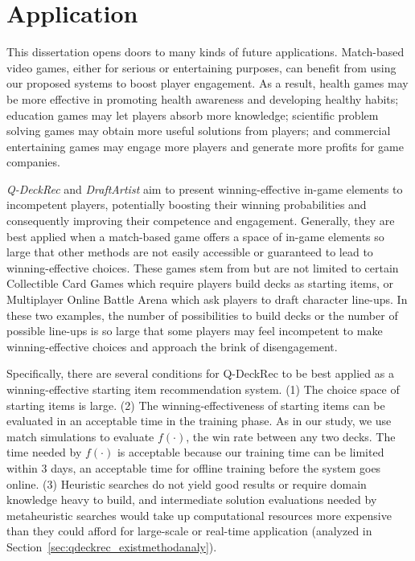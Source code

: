\chapter{Application} %

\label{chapter:application} 

This dissertation opens doors to many kinds of future applications. Match-based video games, either for serious or entertaining purposes, can benefit from using our proposed systems to boost player engagement. As a result, health games may be more effective in promoting health awareness and developing healthy habits; education games may let players absorb more knowledge; scientific problem solving games may obtain more useful solutions from players; and commercial entertaining games may engage more players and generate more profits for game companies.  

\textit{Q-DeckRec} and \textit{DraftArtist} aim to present winning-effective in-game elements to incompetent players, potentially boosting their winning probabilities and consequently improving their competence and engagement. Generally, they are best applied when a match-based game offers a space of in-game elements so large that other methods are not easily accessible or guaranteed to lead to winning-effective choices. These games stem from but are not limited to certain Collectible Card Games which require players build decks as starting items, or Multiplayer Online Battle Arena which ask players to draft character line-ups. In these two examples, the number of possibilities to build decks or the number of possible line-ups is so large that some players may feel incompetent to make winning-effective choices and approach the brink of disengagement. 

Specifically, there are several conditions for Q-DeckRec to be best applied as a winning-effective starting item recommendation system. (1) The choice space of starting items is large. (2) The winning-effectiveness of starting items can be evaluated in an acceptable time in the training phase. As in our study, we use match simulations to evaluate $f(\cdot)$, the win rate between any two decks. The time needed by $f(\cdot)$ is acceptable because our training time can be limited within 3 days, an acceptable time for offline training before the system goes online. (3) Heuristic searches do not yield good results or require domain knowledge heavy to build, and intermediate solution evaluations needed by metaheuristic searches would take up computational resources more expensive than they could afford for large-scale or real-time application (analyzed in Section~\ref{sec:qdeckrec_existmethodanaly}).

